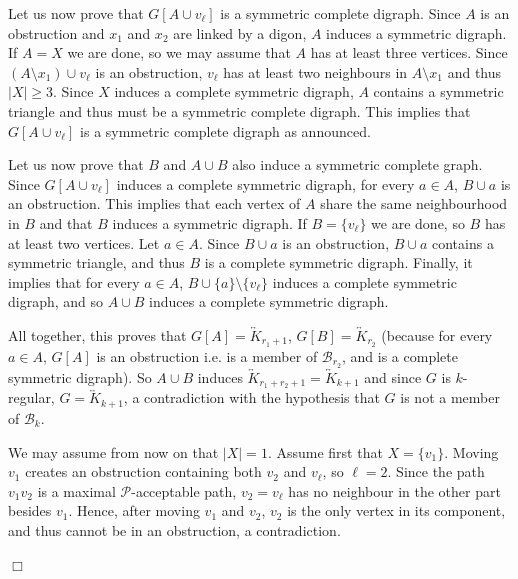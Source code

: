 \documentclass[11pt]{article}
\newcommand{\mc}{\mathcal}
\newcommand{\sm}{\setminus}
\newcounter{claim}
\newenvironment{proof}[1][]%
 {\noindent {\setcounter{claim}{0}\sc proof ---
   }{#1}{}}{\hfill$\Box$\vspace{2ex}}
\begin{document}
\begin{proof}
Let us now prove that $G[A\cup v_{\ell}]$ is a symmetric complete digraph. 
Since $A$ is an obstruction and $x_1$ and $x_2$ are linked by a digon, $A$  induces a symmetric digraph. 
If $A = X$ we are done, so we may assume that $A$ has at least three vertices. 
Since $(A \sm x_1) \cup v_{\ell}$ is an obstruction, $v_{\ell}$ has at least two neighbours in  $A \sm x_1$ and thus $|X| \geq 3$. 
Since $X$ induces a complete symmetric digraph, $A$ contains a symmetric triangle and thus must be a symmetric complete digraph. This implies that $G[A\cup v_{\ell}]$ is a symmetric complete digraph as announced. 

Let us now prove that $B$ and $A \cup B$ also induce a symmetric complete graph. 
Since $G[A \cup v_{\ell}]$ induces a complete symmetric digraph, for every $a \in A$, $B \cup a$ is an obstruction. This implies that each vertex of $A$ share the same neighbourhood in $B$ and that $B$ induces a symmetric digraph.  
If $B = \{v_{\ell}\}$ we are done, so $B$ has at least two vertices. Let $a \in A$. 
Since $B \cup a$ is an obstruction, $B \cup a$ contains a symmetric triangle, and thus $B$ is a complete symmetric digraph. Finally, it implies that for every $a \in A$, $B \cup \{a\} \sm \{v_{\ell}\}$ induces a complete symmetric digraph, and so $A \cup B$ induces a complete symmetric digraph. 

All together, this proves that $G[A] = \overleftrightarrow K_{r_1+1}$, $G[B] = \overleftrightarrow K_{r_2}$ (because for every $a \in A$, $G[A]$ is an obstruction i.e. is a member of $\mathcal B_{r_2}$, and is a complete symmetric digraph). So $A \cup B$ induces $\overleftrightarrow K_{r_1 + r_2 + 1} = \overleftrightarrow K_{k+1}$ and since $G$ is $k$-regular, $G = \overleftrightarrow K_{k+1}$, a contradiction with the hypothesis that $G$ is not a member of $\mc B_{k}$. 
\medskip 

We may assume from now on that $|X| = 1$. 
Assume first that $X= \{v_1\}$. 
Moving $v_1$ creates an obstruction containing both $v_2$ and $v_{\ell}$, so $\ell = 2$. 
Since the path $v_1v_2$ is a maximal $\mc P$-acceptable path, $v_2 = v_{\ell}$ has no neighbour in the other part besides $v_1$. 
Hence, after moving $v_1$ and $v_2$, $v_2$ is the only vertex in its component, and thus cannot be in an obstruction, a contradiction. 


\end{proof}
\end{document}
